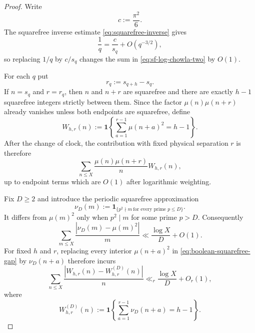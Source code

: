 \documentclass[11pt]{amsart}
\numberwithin{equation}{section}
\theoremstyle{plain}
\theoremstyle{definition}
\theoremstyle{remark}
\begin{document}
\begin{proof}
Write
\begin{equation}
\label{eq:squarefree-density-constant}
c:=\frac{\pi^2}{6}.
\end{equation}
The squarefree inverse estimate \eqref{eq:squarefree-inverse} gives
\begin{equation}
\label{eq:ordinal-natural-weight-change}
\frac1q=\frac{c}{s_q}+O(q^{-3/2}),
\end{equation}
so replacing $1/q$ by $c/s_q$ changes the sum in
\eqref{eq:sf-log-chowla-two} by $O(1)$.

For each $q$ put
\begin{equation}
\label{eq:physical-gap-h}
r_q:=s_{q+h}-s_q.
\end{equation}
If $n=s_q$ and $r=r_q$, then $n$ and $n+r$ are squarefree and there are
exactly $h-1$ squarefree integers strictly between them.  Since the factor
$\mu(n)\mu(n+r)$ already vanishes unless both endpoints are squarefree, define
\begin{equation}
\label{eq:boolean-squarefree-gap}
W_{h,r}(n)
:=\mathbf 1\!\left\{
\sum_{a=1}^{r-1}\mu(n+a)^2=h-1
\right\}.
\end{equation}
After the change of clock, the contribution with fixed physical separation
$r$ is therefore
\begin{equation}
\label{eq:fixed-r-weighted-correlation}
\sum_{n\le X}
\frac{\mu(n)\mu(n+r)}{n}W_{h,r}(n),
\end{equation}
up to endpoint terms which are $O(1)$ after logarithmic weighting.

Fix $D\ge2$ and introduce the periodic squarefree approximation
\begin{equation}
\label{eq:nu-D-definition}
\nu_D(m):=
\mathbf 1_{\{p^2\nmid m\ \text{for every prime }p\le D\}}.
\end{equation}
It differs from $\mu(m)^2$ only when $p^2\mid m$ for some prime $p>D$.
Consequently
\begin{equation}
\label{eq:nu-D-log-error}
\sum_{m\le X}\frac{|\nu_D(m)-\mu(m)^2|}{m}
\ll \frac{\log X}{D}+O(1).
\end{equation}
For fixed $h$ and $r$, replacing every interior $\mu(n+a)^2$ in
\eqref{eq:boolean-squarefree-gap} by $\nu_D(n+a)$ therefore incurs
\begin{equation}
\label{eq:W-D-log-error}
\sum_{n\le X}\frac{|W_{h,r}(n)-W_{h,r}^{(D)}(n)|}{n}
\ll_r \frac{\log X}{D}+O_r(1),
\end{equation}
where
\begin{equation}
\label{eq:W-D-definition}
W_{h,r}^{(D)}(n)
:=\mathbf 1\!\left\{
\sum_{a=1}^{r-1}\nu_D(n+a)=h-1
\right\}.
\end{equation}


\end{proof}
\end{document}
